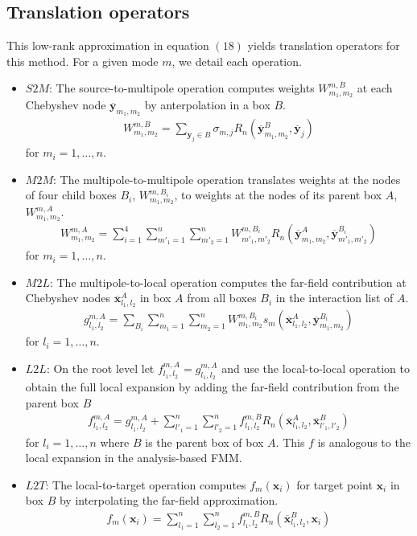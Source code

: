 \documentclass[11pt, oneside]{article}   	%
\begin{document}
\subsection{Translation operators}
This low-rank approximation in equation $(18)$ yields translation operators for this method. For a given mode $m$, we detail each operation.
\begin{itemize}
\item $S2M$: The source-to-multipole operation computes weights $W^{m,B}_{m_1,m_2}$ at each Chebyshev node $\mathbf{\overline{y}}_{m_1,m_2}$ by anterpolation in a box $B$.
\begin{align}
W_{m_1,m_2}^{m,B} = \sum_{\mathbf{y}_j\in B} \sigma_{m,j} R_n(\mathbf{\overline{y}}^B_{m_1,m_2},\mathbf{\overline{y}}_j)
\end{align}
for $m_i = 1,\dots,n$.
\item $M2M$: The multipole-to-multipole operation translates weights at the nodes of four child boxes $B_i$, $W_{m_1,m_2}^{m,B_i}$, to weights at the nodes of its parent box $A$, $W_{m_1,m_2}^{m,A}$.
\begin{align}
W_{m_1,m_2}^{m,A} = \sum_{i=1}^4 \sum_{m'_1=1}^n\sum_{m'_2=1}^n W_{m'_1,m'_2}^{m,B_i} R_n(\mathbf{\overline{y}}^A_{m_1,m_2},\mathbf{\overline{y}}^{B_i}_{m'_1,m'_2})
\end{align}
for $m_i= 1,\dots,n$.
\item $M2L$: The multipole-to-local operation computes the far-field contribution at Chebyshev nodes $\mathbf{\overline{x}}_{l_1,l_2}^A$ in box $A$ from all boxes $B_i$ in the interaction list of $A$.
\begin{align}
g_{l_1,l_2}^{m,A} = \sum_{B_i} \sum_{m_1=1}^n\sum_{m_2=1}^n W_{m_1,m_2}^{m,B_i} s_m(\mathbf{\overline{x}}^{A}_{l_1,l_2},\mathbf{\overline{y}}^{B_i}_{m_1,m_2})
\end{align}
for $l_i = 1,\dots,n$.
\item $L2L$: On the root level let $f^{m,A}_{l_1,l_2}=g^{m,A}_{l_1,l_2}$ and use the local-to-local operation to obtain the full local expansion by adding the far-field contribution from the parent box $B$
\begin{align}
f^{m,A}_{l_1,l_2}=g^{m,A}_{l_1,l_2} + \sum_{l'_1=1}^n \sum_{l'_2=1}^n f^{m,B}_{l_1,l_2} R_n(\mathbf{\overline{x}}_{l_1,l_2}^A,\mathbf{\overline{x}}_{l'_1,l'_2}^B)
\end{align}
for $l_i = 1,\dots,n$ where $B$ is the parent box of box $A$. This $f$ is analogous to the local expansion in the analysis-based FMM.
\item $L2T$: The local-to-target operation computes $f_m(\mathbf{x}_i)$ for target point $\mathbf{x}_i$ in box $B$ by interpolating the far-field approximation.
\begin{align}
f_m(\mathbf{x}_i)=\sum_{l_1=1}^n \sum_{l_2=1}^n f^{m,B}_{l_1,l_2} R_n(\mathbf{\overline{x}}_{l_1,l_2}^B,\mathbf{x}_i)
\end{align}
\end{itemize}
\end{document}
